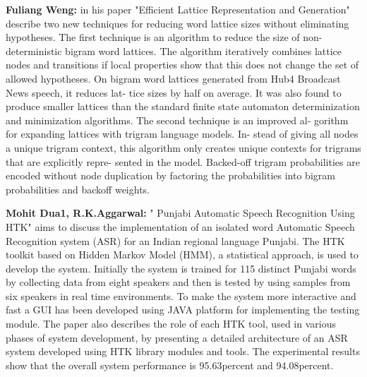 \documentclass[12pt,a4paper,oldfontcommands]{memoir}
\begin{document}
\textbf{Fuliang Weng:} in his paper "Efficient Lattice Representation and Generation" 
describe two
new techniques for reducing word lattice sizes without eliminating
hypotheses. The first technique is an algorithm to reduce the size of
non-deterministic bigram word lattices. The algorithm iteratively
combines lattice nodes and transitions if local properties show that
this does not change the set of allowed hypotheses. On bigram word
lattices generated from Hub4 Broadcast News speech, it reduces lat-
tice sizes by half on average. It was also found to produce smaller
lattices than the standard finite state automaton determinization and
minimization algorithms. The second technique is an improved al-
gorithm for expanding lattices with trigram language models. In-
stead of giving all nodes a unique trigram context, this algorithm
only creates unique contexts for trigrams that are explicitly repre-
sented in the model. Backed-off trigram probabilities are encoded
without node duplication by factoring the probabilities into bigram
probabilities and backoff weights\cite{11}.     

\textbf{Mohit Dua1, R.K.Aggarwal:}  " Punjabi Automatic Speech Recognition Using HTK" aims to discuss the implementation of an isolated
word Automatic Speech Recognition system (ASR) for an
Indian regional language Punjabi. The HTK toolkit based on
Hidden Markov Model (HMM), a statistical approach, is used
to develop the system. Initially the system is trained for 115
distinct Punjabi words by collecting data from eight speakers
and then is tested by using samples from six speakers in real
time environments. To make the system more interactive and
fast a GUI has been developed using JAVA platform for
implementing the testing module. The paper also describes the
role of each HTK tool, used in various phases of system
development, by presenting a detailed architecture of an ASR
system developed using HTK library modules and tools. The
experimental results show that the overall system performance
is 95.63percent and 94.08percent\cite{12}.       
\end{document}
